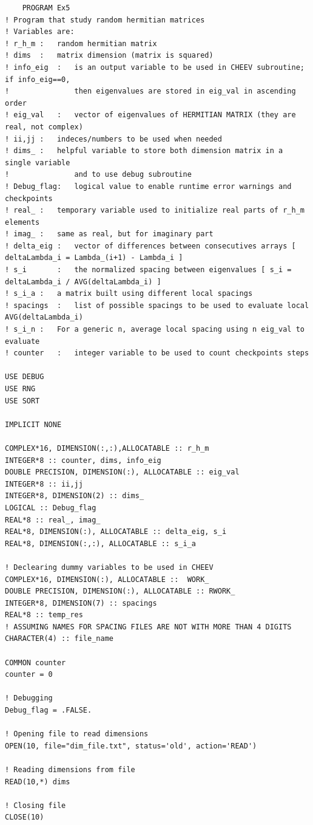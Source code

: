 \documentclass[12pt, a4paper, notitlepage]{report}
\begin{document}
\begin{lstlisting}
	PROGRAM Ex5
! Program that study random hermitian matrices
! Variables are:
! r_h_m	:	random hermitian matrix
! dims	:	matrix dimension (matrix is squared)
! info_eig	:	is an output variable to be used in CHEEV subroutine; if info_eig==0,
!				then eigenvalues are stored in eig_val in ascending order
! eig_val	:	vector of eigenvalues of HERMITIAN MATRIX (they are real, not complex)
! ii,jj	:	indeces/numbers to be used when needed
! dims_	:	helpful variable to store both dimension matrix in a single variable
!				and to use debug subroutine
! Debug_flag:	logical value to enable runtime error warnings and checkpoints
! real_	:	temporary variable used to initialize real parts of r_h_m elements
! imag_	:	same as real, but for imaginary part
! delta_eig	:	vector of differences between consecutives arrays [ deltaLambda_i = Lambda_(i+1) - Lambda_i ]
! s_i		:	the normalized spacing between eigenvalues [ s_i = deltaLambda_i / AVG(deltaLambda_i) ]
! s_i_a	:	a matrix built using different local spacings
! spacings	:	list of possible spacings to be used to evaluate local AVG(deltaLambda_i)
! s_i_n	:	For a generic n, average local spacing using n eig_val to evaluate
! counter	:	integer variable to be used to count checkpoints steps

USE DEBUG
USE RNG
USE SORT

IMPLICIT NONE

COMPLEX*16, DIMENSION(:,:),ALLOCATABLE :: r_h_m
INTEGER*8 :: counter, dims, info_eig
DOUBLE PRECISION, DIMENSION(:), ALLOCATABLE :: eig_val
INTEGER*8 :: ii,jj
INTEGER*8, DIMENSION(2) :: dims_
LOGICAL :: Debug_flag
REAL*8 :: real_, imag_
REAL*8, DIMENSION(:), ALLOCATABLE :: delta_eig, s_i
REAL*8, DIMENSION(:,:), ALLOCATABLE :: s_i_a

! Declearing dummy variables to be used in CHEEV
COMPLEX*16, DIMENSION(:), ALLOCATABLE ::  WORK_
DOUBLE PRECISION, DIMENSION(:), ALLOCATABLE :: RWORK_
INTEGER*8, DIMENSION(7) :: spacings
REAL*8 :: temp_res
! ASSUMING NAMES FOR SPACING FILES ARE NOT WITH MORE THAN 4 DIGITS
CHARACTER(4) :: file_name

COMMON counter
counter = 0

! Debugging
Debug_flag = .FALSE.

! Opening file to read dimensions
OPEN(10, file="dim_file.txt", status='old', action='READ')

! Reading dimensions from file
READ(10,*) dims

! Closing file
CLOSE(10)


\end{lstlisting}
\end{document}
